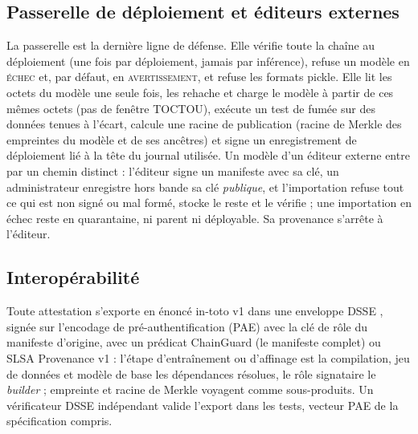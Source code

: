\documentclass[conference]{IEEEtran}
\newcommand{\st}[1]{\textsc{#1}}
\begin{document}
\subsection{Passerelle de déploiement et éditeurs externes}
La passerelle est la dernière ligne de défense. Elle vérifie toute la chaîne au déploiement (une fois par déploiement, jamais par inférence), refuse un modèle en \st{échec} et, par défaut, en \st{avertissement}, et refuse les formats pickle. Elle lit les octets du modèle une seule fois, les rehache et charge le modèle à partir de ces mêmes octets (pas de fenêtre TOCTOU), exécute un test de fumée sur des données tenues à l'écart, calcule une racine de publication (racine de Merkle des empreintes du modèle et de ses ancêtres) et signe un enregistrement de déploiement lié à la tête du journal utilisée. Un modèle d'un éditeur externe entre par un chemin distinct : l'éditeur signe un manifeste avec sa clé, un administrateur enregistre hors bande sa clé \emph{publique}, et l'importation refuse tout ce qui est non signé ou mal formé, stocke le reste et le vérifie ; une importation en échec reste en quarantaine, ni parent ni déployable. Sa provenance s'arrête à l'éditeur.

\subsection{Interopérabilité}
Toute attestation s'exporte en énoncé in-toto v1 dans une enveloppe DSSE \cite{intotoattest,dsse}, signée sur l'encodage de pré-authentification (PAE) avec la clé de rôle du manifeste d'origine, avec un prédicat ChainGuard (le manifeste complet) ou SLSA Provenance v1 \cite{slsa11} : l'étape d'entraînement ou d'affinage est la compilation, jeu de données et modèle de base les dépendances résolues, le rôle signataire le \emph{builder} ; empreinte et racine de Merkle voyagent comme sous-produits. Un vérificateur DSSE indépendant valide l'export dans les tests, vecteur PAE de la spécification compris.
\end{document}
